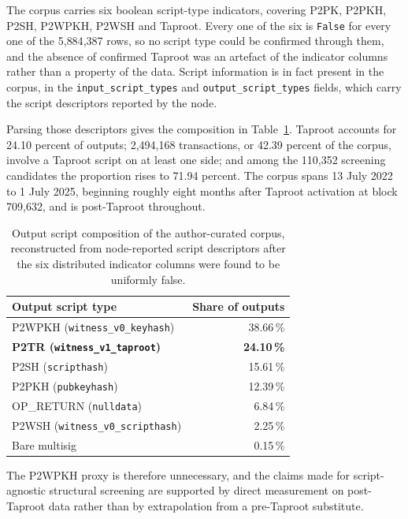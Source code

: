 \documentclass[12pt,a4paper]{article}
\begin{document}
The corpus carries six boolean script-type indicators, covering
P2PK, P2PKH, P2SH, P2WPKH, P2WSH and Taproot. Every one of the
six is \texttt{False} for every one of the 5{,}884{,}387 rows, so
no script type could be confirmed through them, and the absence
of confirmed Taproot was an artefact of the indicator columns
rather than a property of the data. Script information is in fact
present in the corpus, in the \texttt{input\_script\_types} and
\texttt{output\_script\_types} fields, which carry the script
descriptors reported by the node.

Parsing those descriptors gives the composition in
Table~\ref{tab:script_composition}. Taproot accounts for 24.10
percent of outputs; 2{,}494{,}168 transactions, or 42.39 percent
of the corpus, involve a Taproot script on at least one side; and
among the 110,352 screening candidates the proportion rises to
71.94 percent. The corpus spans 13 July 2022 to 1 July 2025,
beginning roughly eight months after Taproot activation at block
709{,}632, and is post-Taproot throughout.

\begin{table}[htbp]
\centering
\small
\caption{Output script composition of the author-curated corpus,
reconstructed from node-reported script descriptors after the six
distributed indicator columns were found to be uniformly false.}
\label{tab:script_composition}
\begin{tabular}{lr}
\toprule
Output script type & Share of outputs \\
\midrule
P2WPKH (\texttt{witness\_v0\_keyhash})        & 38.66\,\% \\
\textbf{P2TR (\texttt{witness\_v1\_taproot})} & \textbf{24.10\,\%} \\
P2SH (\texttt{scripthash})                    & 15.61\,\% \\
P2PKH (\texttt{pubkeyhash})                   & 12.39\,\% \\
OP\_RETURN (\texttt{nulldata})                &  6.84\,\% \\
P2WSH (\texttt{witness\_v0\_scripthash})      &  2.25\,\% \\
Bare multisig                                 &  0.15\,\% \\
\bottomrule
\end{tabular}
\end{table}

The P2WPKH proxy is therefore unnecessary, and the claims made
for script-agnostic structural screening are supported by direct
measurement on post-Taproot data rather than by extrapolation
from a pre-Taproot substitute.
\end{document}
